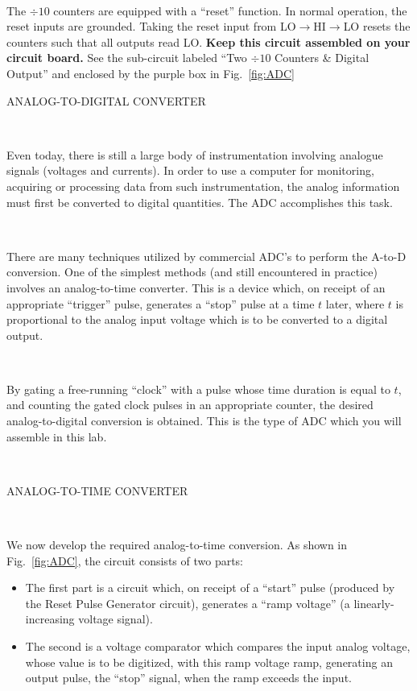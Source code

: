 \documentclass[12pt,oneside,openany,letterpaper]{article}
\begin{document}
~

\noindent The $\div 10$ counters are equipped with a ``reset'' function. In normal operation, the reset inputs are grounded. Taking the reset input from LO$\to$HI$\to$LO resets the counters such that all outputs read LO. {\bf Keep this circuit assembled on your circuit board.} See the sub-circuit labeled ``Two $\div 10$ Counters \& Digital Output'' and enclosed by the purple box in Fig.~\ref{fig:ADC}

\clearpage

ANALOG-TO-DIGITAL CONVERTER

~

\noindent Even today, there is still a large body of instrumentation involving analogue signals (voltages and currents). In order to use a computer for monitoring, acquiring or processing data from such instrumentation, the analog information must first be converted to digital quantities. The ADC accomplishes this task.

~

\noindent There are many techniques utilized by commercial ADC's to perform the A-to-D conversion. One of the simplest methods (and still encountered in practice) involves an analog-to-time converter. This is a device which, on receipt of an appropriate ``trigger'' pulse, generates a ``stop'' pulse at a time $t$ later, where $t$ is proportional to the analog input voltage which is to be converted to a digital output.

~

\noindent By gating a free-running ``clock'' with a pulse whose time duration is equal to $t$, and counting the gated clock pulses in an appropriate counter, the desired analog-to-digital conversion is obtained. This is the type of ADC which you will assemble in this lab.

~

\noindent ANALOG-TO-TIME CONVERTER

~

\noindent We now develop the required analog-to-time conversion. As shown in Fig.~\ref{fig:ADC}, the circuit consists of two parts:
\begin{itemize}
\item The first part is a circuit which, on receipt of a ``start'' pulse (produced by the Reset Pulse Generator circuit), generates a ``ramp voltage'' (a linearly-increasing voltage signal).
\item The second is a voltage comparator which compares the input analog voltage, whose value is to be digitized, with this ramp voltage ramp, generating an output pulse, the ``stop'' signal, when the ramp exceeds the input.
\end{itemize} 
\end{document}
